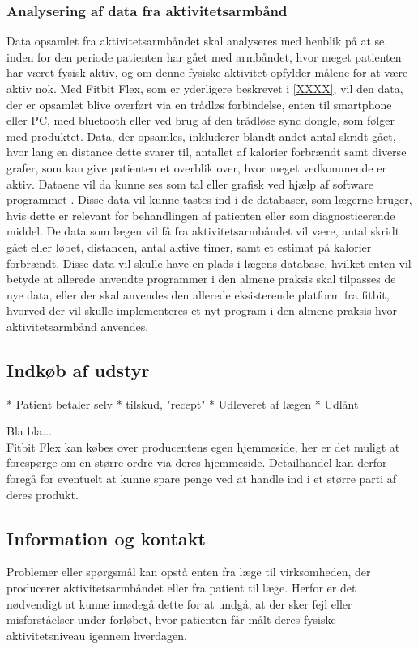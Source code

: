 \subsubsection{Analysering af data fra aktivitetsarmbånd}  
Data opsamlet fra aktivitetsarmbåndet skal analyseres med henblik på at se, inden for den periode patienten har gået med armbåndet, hvor meget patienten har været fysisk aktiv, og om denne fysiske aktivitet opfylder målene for at være aktiv nok.  
Med Fitbit Flex, som er yderligere beskrevet i \autoref{XXXX}, vil den data, der er opsamlet blive overført via en trådløs forbindelse, enten til smartphone eller PC, med bluetooth eller ved brug af den trådløse sync dongle, som følger med produktet. Data, der opsamles, inkluderer blandt andet antal skridt gået, hvor lang en distance dette svarer til, antallet af kalorier forbrændt samt diverse grafer, som kan give patienten et overblik over, hvor meget vedkommende er aktiv. Dataene vil da kunne ses som tal eller grafisk ved hjælp af software programmet \citep{fitbitflex}. Disse data vil kunne tastes ind i de databaser, som lægerne bruger, hvis dette er relevant for behandlingen af patienten eller som diagnosticerende middel. De data som lægen vil få fra aktivitetsarmbåndet vil være, antal skridt gået eller løbet, distancen, antal aktive timer, samt et estimat på kalorier forbrændt. Disse data vil skulle have en plads i lægens database, hvilket enten vil betyde at allerede anvendte programmer i den almene praksis skal tilpasses de nye data, eller der skal anvendes den allerede eksisterende platform fra fitbit, hvorved der vil skulle implementeres et nyt program i den almene praksis hvor aktivitetsarmbånd anvendes. 

\subsection{Indkøb af udstyr}	


* Patient betaler selv
* tilskud, "recept"
* Udleveret af lægen
* Udlånt 
 
Bla bla...\\
Fitbit Flex kan købes over producentens egen hjemmeside, her er det muligt at forespørge om en større ordre via deres hjemmeside. Detailhandel kan derfor foregå for eventuelt at kunne spare penge ved at handle ind i et større parti af deres produkt.

\subsection{Information og kontakt}
Problemer eller spørgsmål kan opstå enten fra læge til virksomheden, der producerer aktivitetsarmbåndet eller fra patient til læge. Herfor er det nødvendigt at kunne imødegå dette for at undgå, at der sker fejl eller misforståelser under forløbet, hvor patienten får målt deres fysiske aktivitetsniveau igennem hverdagen. 

